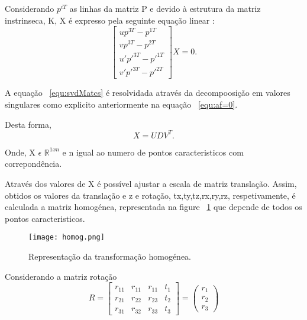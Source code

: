 	Considerando $p^{iT}$ as linhas da matriz P e devido à estrutura da matriz instrinseca, K, X é expresso pela seguinte equação linear :  \begin{equation}\label{equ:svdMatcs} 
	\left[ \begin{array}{cccc}
	up^{3T} - p^{1T} \\
	vp^{3T} - p^{2T} \\
	u'p'^{3T} - p'^{1T} \\
	v'p'^{3T} - p'^{2T} 
	\end{array} \right] X = 0 .
	\end{equation}
	
	A equação ~\ref{equ:svdMatcs} é resolvidada através da decompoosição em valores singulares como explicito anteriormente na equação ~\ref{equ:af=0}.
	
	Desta forma, \[ X = UDV^T. \] 
	
	Onde, X $\epsilon$ $\mathbb{R}^{1xn}$ e n igual ao numero de pontos caracteristicos com correpondência.
	
	Através dos valores de X é possível ajustar a escala de matriz translação. Assim, obtidos os valores da translação e z e rotação, tx,ty,tz,rx,ry,rz, respetivamente, é calculada a matriz homogénea, representada na figure ~\ref{fig:homog} que depende de todos os pontos caracteristicos.
	
	\begin{figure}[h!] %
		\begin{center}
			\leavevmode		
			\texttt{[image: homog.png]}
			\caption{Representação da transformação homogénea.}
			\label{fig:homog}
		\end{center}
	\end{figure}

	\vspace{5mm}  %

	Considerando a matriz rotação \[  R = \left[ \begin{array}{cccc}
	r_{11} & r_{11} & r_{11} & t_1 \\ 
	r_{21} & r_{22} & r_{23} & t_2 \\ 
	r_{31} & r_{32} & r_{33} & t_3 
	\end{array} \right] = \left(\begin{array}{ccc}
	r_1 \\ r_2 \\ r_3
	\end{array}\right)\]
	

